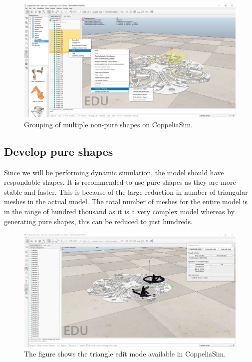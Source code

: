 \documentclass[a4paper, 12pt, oneside]{book}
\begin{document}
\begin{figure}[H]
    \begin{center}
        \includegraphics[width=.95\linewidth]{figures/merging_step.JPG}
        \caption{Grouping of multiple non-pure shapes on CoppeliaSim.}
        \label{fig:merge}
    \end{center}
\end{figure}

\subsection{Develop pure shapes}
Since we will be performing dynamic simulation, the model should have respondable shapes. It is recommended to use pure shapes as they are more stable and faster. This is because of the large reduction in number of triangular meshes in the actual model. The total number of meshes for the entire model is in the range of hundred thousand as it is a very complex model whereas by generating pure shapes, this can be reduced to just hundreds. \\

\begin{figure}[H]
    \begin{center}
        \includegraphics[width=.95\linewidth]{figures/extractShape.JPG}
        \caption{The figure shows the triangle edit mode available in CoppeliaSim.}
        \label{fig:extractShape}
    \end{center}
\end{figure}
\end{document}
